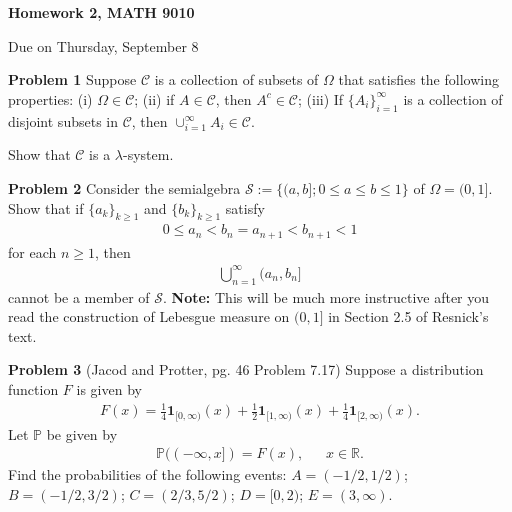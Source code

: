 \documentclass{article}
\begin{document}
\begin{center}

\textbf{Homework 2, MATH 9010}

Due on Thursday, September 8

\end{center}

\vspace{3 mm}

\noindent \textbf{Problem 1} Suppose $\mathcal{C}$ is a collection of subsets of $\Omega$ that satisfies the following properties:  (i) $\Omega \in \mathcal{C}$; (ii) if $A \in \mathcal{C}$, then $A^{c} \in \mathcal{C}$; (iii) If $\{A_{i}\}_{i = 1}^{\infty}$ is a collection of disjoint subsets in $\mathcal{C}$, then $\cup_{i=1}^{\infty}A_{i} \in \mathcal{C}$.

\vspace{2 mm}

Show that $\mathcal{C}$ is a $\lambda$-system.

\vspace{3 mm}

\noindent \textbf{Problem 2} Consider the semialgebra $\mathcal{S} := \{(a,b]; 0 \leq a \leq b \leq 1\}$ of $\Omega = (0,1]$.  Show that if $\{a_{k}\}_{k \geq 1}$ and $\{b_{k}\}_{k \geq 1}$ satisfy
\begin{eqnarray*} 0 \leq a_{n} < b_{n} = a_{n+1} < b_{n+1} < 1 \end{eqnarray*} for each $n \geq 1$, then
\begin{eqnarray*} \bigcup_{n=1}^{\infty}(a_{n}, b_{n}] \end{eqnarray*} cannot be a member of $\mathcal{S}$.  \textbf{Note:} This will be much more instructive after you read the construction of Lebesgue measure on $(0,1]$ in Section 2.5 of Resnick's text.

\vspace{3 mm}

\noindent \textbf{Problem 3} (Jacod and Protter, pg. 46 Problem 7.17) Suppose a distribution function $F$ is given by
\begin{eqnarray*} F(x) = \frac{1}{4}\mathbf{1}_{[0, \infty)}(x) + \frac{1}{2}\mathbf{1}_{[1,\infty)}(x) + \frac{1}{4}\mathbf{1}_{[2,\infty)}(x). \end{eqnarray*}  Let $\mathbb{P}$ be given by
\begin{eqnarray*} \mathbb{P}((-\infty, x]) = F(x), ~~~~~~~ x \in \mathbb{R}. \end{eqnarray*}  Find the probabilities of the following events:  $A = (-1/2, 1/2)$; $B = (-1/2, 3/2)$; $C = (2/3, 5/2)$; $D = [0,2)$; $E = (3,\infty)$.
\end{document}
